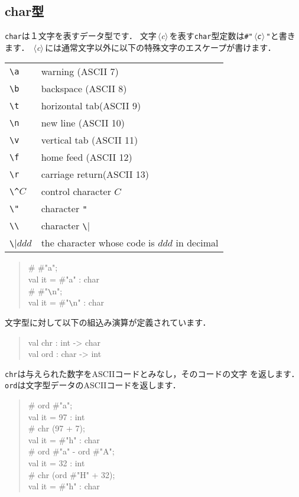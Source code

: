 \documentclass{jbook}
\newcommand{\nonterm}[1]{\mbox{$\,\langle$}{\it #1}\mbox{$\rangle\,$}}
\newenvironment{program}{\begin{quote}\begin{tt}}%
                        {\end{tt}\end{quote}}
\begin{document}
\subsection{char型}
	{\tt char}は１文字を表すデータ型です．
	文字\nonterm{c}を表す{\tt char}型定数は{\tt \#"\nonterm{c}"}と書きます．
	\nonterm{c}には通常文字以外に以下の特殊文字のエスケープが書けます．
\begin{center}
\begin{tabular}{|l|l|}
\hline
\verb|\a| & {warning (ASCII 7)}\\
\verb|\b| & {backspace (ASCII 8)}\\
\verb|\t| & {horizontal tab(ASCII 9)}\\
\verb|\n| & {new line (ASCII 10)}\\
\verb|\v| & {vertical tab (ASCII 11)}\\
\verb|\f| & {home feed (ASCII 12)}\\
\verb|\r| & {carriage return(ASCII 13)}\\
\verb|\^|$C$ & {control character $C$}\\
\verb|\"| & {character {\tt \verb|"|}}\\ %
\verb|\\| & {character \verb|\|}\\
\verb|\|$ddd$ &  {the character whose code is $ddd$ in decimal}
\\\hline
\end{tabular}
\end{center}
\begin{program}
\# \#"a";\\
val it = \#"a" : char\\
\# \#"\verb|\|n";\\
val it = \#"\verb|\|n" : char
\end{program}
	文字型に対して以下の組込み演算が定義されています．
\begin{program}
val chr : int -> char\\
val ord : char -> int
\end{program}
	{\tt chr}は与えられた数字をASCIIコードとみなし，そのコードの文字
を返します．
	{\tt ord}は文字型データのASCIIコードを返します．
\begin{program}
\# ord \#"a";\\
val it = 97 : int\\
\# chr (97 + 7);\\
val it = \#"h" : char\\
\# ord \#"a" - ord \#"A";\\
val it = 32 : int\\
\# chr (ord \#"H" + 32);\\
val it = \#"h" : char
\end{program}
\end{document}
